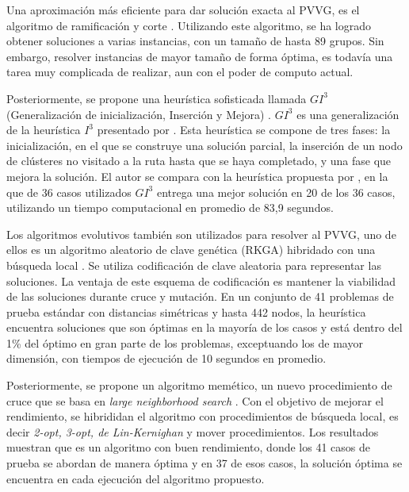 Una aproximación más eficiente para dar solución exacta al PVVG, es el algoritmo de ramificación y corte \citep{fischetti1995symmetric}. Utilizando este algoritmo, se ha logrado obtener soluciones a varias instancias, con un tamaño de hasta 89 grupos. Sin embargo, resolver instancias de mayor tamaño de forma óptima, es todavía una tarea muy complicada de realizar, aun con el poder de computo actual.


Posteriormente, se propone una heurística sofisticada llamada $GI^{3}$ (Generalización de inicialización, Inserción y Mejora) \citep{renaud1998efficient}. $GI^{3}$ es una generalización de la heurística $I^{3}$ presentado por \cite{renaud1996fast}. Esta heurística se compone de tres fases: la inicialización, en el que se construye una solución parcial, la inserción de un nodo de clústeres no visitado a la ruta hasta que se haya completado, y una fase que mejora la solución. El autor se compara con la heurística propuesta por \cite{fischetti1997branch}, en la que de 36 casos utilizados $GI^{3}$ entrega una mejor solución en 20 de los 36 casos, utilizando un tiempo computacional en promedio de 83,9 segundos.

Los algoritmos evolutivos también son utilizados para resolver al PVVG, uno de ellos es un algoritmo aleatorio de clave genética (RKGA) hibridado con una búsqueda local \citep{snyder2006random}. Se utiliza codificación de clave aleatoria para representar las soluciones. La ventaja de este esquema de codificación es mantener la viabilidad de las soluciones durante cruce y mutación. En un conjunto de 41 problemas de prueba estándar con distancias simétricas y hasta 442 nodos, la heurística encuentra soluciones que son óptimas en la mayoría de los casos y está dentro del 1\% del óptimo en gran parte de los problemas, exceptuando los de mayor dimensión, con tiempos de ejecución de 10 segundos en promedio.

Posteriormente, se propone un algoritmo memético, un nuevo procedimiento de cruce que se basa en \textit{large neighborhood search} \citep{bontoux2010memetic}. Con el objetivo de mejorar el rendimiento, se hibrididan el algoritmo con procedimientos de búsqueda local, es decir \textit{2-opt, 3-opt, de Lin-Kernighan} y mover procedimientos. Los resultados muestran que es un algoritmo con buen rendimiento, donde los 41 casos de prueba se abordan de manera óptima y en 37 de esos casos, la solución óptima se encuentra en cada ejecución del algoritmo propuesto.

